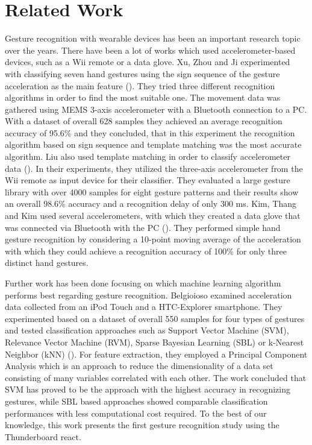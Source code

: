 
\chapter{Related Work}
\label{ch:Related Work}

Gesture recognition with wearable devices has been an important research topic over the years. 
There have been a lot of works which used accelerometer-based devices, such as a Wii remote or a data glove. 
Xu, Zhou and Ji experimented with classifying seven hand gestures using the sign sequence of the gesture acceleration as the main feature (\cite{xu}). 
They tried three different recognition algorithms in order to find the most suitable one. 
The movement data was gathered using MEMS 3-axis accelerometer with a Bluetooth connection to a PC. 
With a dataset of overall 628 samples they achieved an average recognition accuracy of 95.6\% and they concluded, that in this experiment the recognition algorithm based on sign sequence and template matching was the most accurate algorithm. 
Liu also used template matching in order to classify accelerometer data (\cite{liu}). 
In their experiments, they utilized the three-axis accelerometer from the Wii remote as input device for their classifier. 
They evaluated a large gesture library with over 4000 samples for eight gesture patterns and their results show an overall 98.6\% accuracy and a recognition delay of only 300 ms. 
Kim, Thang and Kim used several accelerometers, with which they created a data glove that was connected via Bluetooth with the PC (\cite{kim}). 
They performed simple hand gesture recognition by considering a 10-point moving average of the acceleration with which they could achieve a recognition accuracy of 100\% for only three distinct hand gestures. 

Further work has been done focusing on which machine learning algorithm performs best regarding gesture recognition. 
Belgioioso examined acceleration data collected from an iPod Touch and a HTC-Explorer smartphone. 
They experimented based on a dataset of overall 550 samples for four types of gestures and tested classification approaches such as Support Vector Machine (SVM), Relevance Vector Machine (RVM), Sparse Bayesian Learning (SBL) or k-Nearest Neighbor (kNN) (\cite{belgioioso}). 
For feature extraction, they employed a Principal Component Analysis which is an approach to reduce the dimensionality of a data set consisting of many variables correlated with each other. 
The work concluded that SVM has proved to be the approach with the highest accuracy in recognizing gestures, while SBL based approaches showed comparable classification performances with less computational cost required.
To the best of our knowledge, this work presents the first gesture recognition study using the Thunderboard react.


